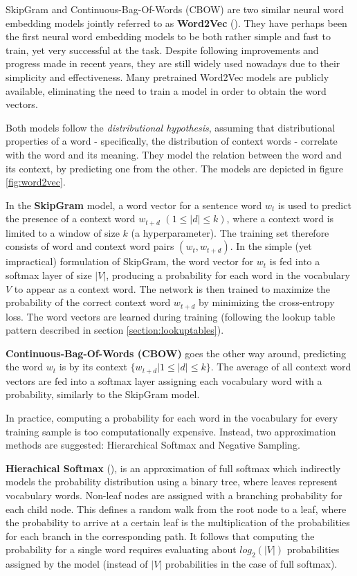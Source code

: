 SkipGram and Continuous-Bag-Of-Words (CBOW) are two similar neural word embedding models jointly referred to as \textbf{Word2Vec} (\cite{word2vec}). They have perhaps been the first neural word embedding models to be both rather simple and fast to train, yet very successful at the task. Despite following improvements and progress made in recent years, they are still widely used nowadays due to their simplicity and effectiveness. Many pretrained Word2Vec models are publicly available, eliminating the need to train a model in order to obtain the word vectors. 

Both models follow the \emph{distributional hypothesis}, assuming that distributional properties of a word - specifically, the distribution of context words - correlate with the word and its meaning. They model the relation between the word and its context, by predicting one from the other. The models are depicted in figure \ref{fig:word2vec}. 

In the \textbf{SkipGram} model, a word vector for a sentence word $w_t$ is used to predict the presence of a context word $w_{t+d}$ $(1 \leq |d| \leq k)$, where a context word is limited to a window of size $k$ (a hyperparameter). The training set therefore consists of word and context word pairs $(w_t, w_{t+d})$. In the simple (yet impractical) formulation of SkipGram, the word vector for $w_t$ is fed into a softmax layer of size $|V|$, producing a probability for each word in the vocabulary $V$ to appear as a context word. The network is then trained to maximize the probability of the correct context word $w_{t+d}$ by minimizing the cross-entropy loss. The word vectors are learned during training (following the lookup table pattern described in section \ref{section:lookuptables}).

\textbf{Continuous-Bag-Of-Words (CBOW)} goes the other way around, predicting the word $w_t$ is by its context $\{w_{t+d} | 1 \leq |d| \leq k\}$. The average of all context word vectors are fed into a softmax layer assigning each vocabulary word with a probability, similarly to the SkipGram model. 

In practice, computing a probability for each word in the vocabulary for every training sample is too computationally expensive. Instead, two approximation methods are suggested: Hierarchical Softmax and Negative Sampling. 

\textbf{Hierachical Softmax} (\cite{hierarchicalsoftmax}), is an approximation of full softmax which indirectly models the probability distribution using a binary tree, where leaves represent vocabulary words. Non-leaf nodes are assigned with a branching probability for each child node. This defines a random walk from the root node to a leaf, where the probability to arrive at a certain leaf is the multiplication of the probabilities for each branch in the corresponding path. It follows that computing the probability for a single word requires evaluating about $log_2(|V|)$ probabilities assigned by the model (instead of $|V|$ probabilities in the case of full softmax).

